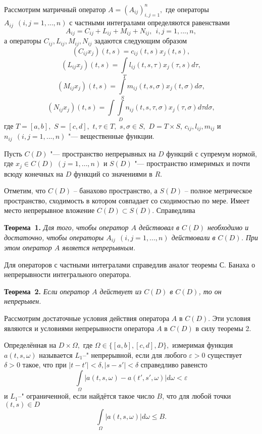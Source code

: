\vzmscaption

Рассмотрим матричный оператор $A= (A_{ij})_{i,j=1}^n,$
где операторы $A_{ij} \ \ (i,j=1,...,n)$ с частными интегралами определяются равенствами
$$
A_{ij}=C_{ij}+L_{ij}+M_{ij}+N_{ij}, \ \ i,j=1,...,n,
$$
а операторы $C_{ij},L_{ij},M_{ij},N_{ij}$ задаются следующим образом
$$
(C_{ij}x_j)(t,s)=c_{ij}(t,s)x_j(t,s),
$$
$$
(L_{ij}x_j)(t,s)=\int\limits_T l_{ij}(t,s,\tau)x_j(\tau,s)d\tau,
$$
$$
(M_{ij}x_j)(t,s)=\int\limits_S m_{ij}(t,s,\sigma)x_j(t,\sigma)d\sigma,
$$
$$
(N_{ij}x_j)(t,s)=\int\int\limits_D n_{ij}(t,s,\tau,\sigma)x_j(\tau,\sigma)d\tau d\sigma,
$$
где $T=[a,b],$ $S=[c,d],$ $t,\tau\in T,$ $s,\sigma\in S,$ $D=T\times S $, $c_{ij}, l_{ij}, m_{ij}$ и $n_{ij} \ \ (i,j=1,...,n)$ "--- вещественные функции.

Пусть $C(D)$ "--- пространство непрерывных на $D$ функций с супремум нормой, где $x_j\in C(D)$ $(j=1,\dots,n)$ и $S(D)$ "--- пространство измеримых и почти всюду конечных на $D$ функций со значениями в $R$.

Отметим, что $C(D)$ -- банахово пространство, а $S(D)$ -- полное
метрическое пространство, сходимость в котором совпадает со
сходимостью по мере. Имеет место непрерывное вложение
$C(D)\subset S(D)$. Справедлива

\textbf{Теорема~1.} {\it Для того, чтобы оператор $A$ действовал в $C(D)$ необходимо и достаточно, чтобы операторы $A_{ij} \ \ (i,j=1,...,n)$ действовали в $C(D)$. При этом оператор $A$ является непрерывным.}

Для операторов с частными интегралами справедлив аналог теоремы
С. Банаха о непрерывности интегрального оператора.

\textbf{Теорема~2.} {\it Если оператор $A$ действует из $C(D)$ в $C(D)$, то он непрерывен.}

Рассмотрим достаточные условия действия оператора $A$ в
$C(D)$. Эти условия являются и условиями непрерывности оператора
$A$ в $C(D)$ в силу теоремы 2.

Определённая на $D\times\Omega,$ где $\Omega\in\{[a,b], [c,d], D\},$ измеримая функция $a(t,s,\omega)$ называется $L_1$--" непрерывной, если для любого $\varepsilon>0$ существует $\delta>0$ такое, что при $|t-t'|<\delta, |s-s'|<\delta$ справедливо равенсто
$$
\int\limits_\Omega|a(t,s,\omega)-a(t',s',\omega)|d\omega<\varepsilon
$$
и $L_1$--" ограниченной, если найдётся такое число $B$, что для любой точки
$(t,s)\in D$
$$
\int\limits_\Omega|a(t,s,\omega)|d\omega\le B.
$$

